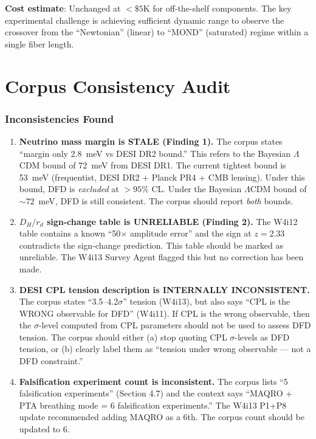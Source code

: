 \documentclass[11pt]{article}
\newcommand{\LCDM}{$\Lambda$CDM}
\begin{document}
\textbf{Cost estimate}: Unchanged at $<\$5$K for off-the-shelf
components.  The key experimental challenge is achieving sufficient
dynamic range to observe the crossover from the ``Newtonian'' (linear)
to ``MOND'' (saturated) regime within a single fiber length.


\part{Corpus Consistency Audit}

\section{Inconsistencies Found}

\begin{tcolorbox}[colback=red!5!white, colframe=red!60!black,
  title=\textbf{INCONSISTENCIES REQUIRING RESOLUTION}]

\begin{enumerate}

\item \textbf{Neutrino mass margin is STALE (Finding 1).}  The corpus
  states ``margin only 2.8~meV vs DESI DR2 bound.''  This refers to
  the Bayesian \LCDM{} bound of 72~meV from DESI DR1.  The current
  tightest bound is 53~meV (frequentist, DESI DR2 + Planck PR4 + CMB
  lensing).  Under this bound, DFD is \emph{excluded} at $>95\%$ CL.
  Under the Bayesian \LCDM{} bound of $\sim 72$~meV, DFD is still
  consistent.  The corpus should report \emph{both} bounds.

\item \textbf{$D_H/r_d$ sign-change table is UNRELIABLE (Finding 2).}
  The W4i12 table contains a known ``50$\times$ amplitude error'' and
  the sign at $z = 2.33$ contradicts the sign-change prediction.  This
  table should be marked as unreliable.  The W4i13 Survey Agent flagged
  this but no correction has been made.

\item \textbf{DESI CPL tension description is INTERNALLY INCONSISTENT.}
  The corpus states ``3.5--4.2$\sigma$'' tension (W4i13), but also
  says ``CPL is the WRONG observable for DFD'' (W4i11).  If CPL is
  the wrong observable, then the $\sigma$-level computed from CPL
  parameters should not be used to assess DFD tension.  The corpus
  should either (a) stop quoting CPL $\sigma$-levels as DFD tension,
  or (b) clearly label them as ``tension under wrong observable ---
  not a DFD constraint.''

\item \textbf{Falsification experiment count is inconsistent.}  The
  corpus lists ``5 falsification experiments'' (Section 4.7) and the
  context says ``MAQRO + PTA breathing mode = 6 falsification
  experiments.''  The W4i13 P1+P8 update recommended adding MAQRO as
  a 6th.  The corpus count should be updated to 6.

\end{enumerate}

\end{tcolorbox}
\end{document}
